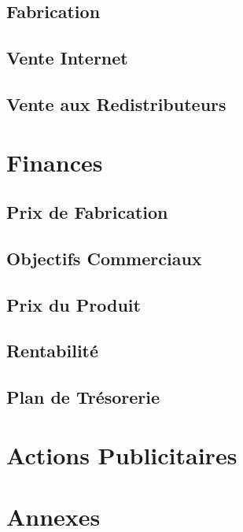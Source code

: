 \documentclass[10pt,a4paper]{article}
\begin{document}
\subsection{Fabrication}
\subsection{Vente Internet}
\subsection{Vente aux Redistributeurs}
\section{Finances}
\subsection{Prix de Fabrication}
\subsection{Objectifs Commerciaux}
\subsection{Prix du Produit}
\subsection{Rentabilité}
\subsection{Plan de Trésorerie}
\section{Actions Publicitaires}
\section{Annexes}
\end{document}
